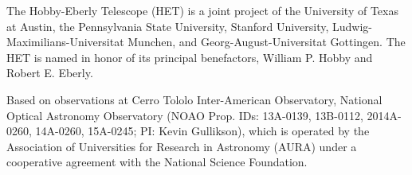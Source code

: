 \documentclass{emulateapj}
\begin{document}
The Hobby-Eberly Telescope (HET) is a joint project of the University of Texas at Austin, the Pennsylvania State University, Stanford University, Ludwig-Maximilians-Universitat Munchen, and Georg-August-Universitat Gottingen. The HET is named in honor of its principal benefactors, William P. Hobby and Robert E. Eberly.

Based on observations at Cerro Tololo Inter-American Observatory, National Optical Astronomy Observatory (NOAO Prop. IDs: 13A-0139, 13B-0112, 2014A-0260, 14A-0260, 15A-0245; PI: Kevin Gullikson), which is operated by the Association of Universities for Research in Astronomy (AURA) under a cooperative agreement with the National Science Foundation. 










\newpage
\clearpage
\end{document}
